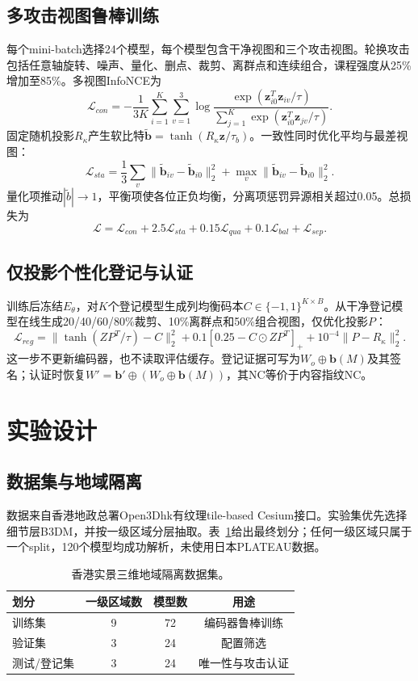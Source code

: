 \documentclass[UTF8,fontset=fandol,11pt]{ctexart}
\begin{document}
\subsection{多攻击视图鲁棒训练}
每个mini-batch选择24个模型，每个模型包含干净视图和三个攻击视图。轮换攻击包括任意轴旋转、噪声、量化、删点、裁剪、离群点和连续组合，课程强度从25\%增加至85\%。多视图InfoNCE为
\begin{equation}\mathcal L_{con}=-\frac1{3K}\sum_{i=1}^K\sum_{v=1}^3\log\frac{\exp(\bm z_{i0}^T\bm z_{iv}/\tau)}{\sum_{j=1}^K\exp(\bm z_{i0}^T\bm z_{jv}/\tau)}.\end{equation}
固定随机投影$R_\kappa$产生软比特$\widetilde{\bm b}=\tanh(R_\kappa\bm z/\tau_b)$。一致性同时优化平均与最差视图：
\begin{equation}\mathcal L_{sta}=\frac13\sum_v\|\widetilde{\bm b}_{iv}-\widetilde{\bm b}_{i0}\|_2^2+\max_v\|\widetilde{\bm b}_{iv}-\widetilde{\bm b}_{i0}\|_2^2.\end{equation}
量化项推动$|\widetilde b|\to1$，平衡项使各位正负均衡，分离项惩罚异源相关超过0.05。总损失为
\begin{equation}\mathcal L=\mathcal L_{con}+2.5\mathcal L_{sta}+0.15\mathcal L_{qua}+0.1\mathcal L_{bal}+\mathcal L_{sep}.\end{equation}

\subsection{仅投影个性化登记与认证}
训练后冻结$E_\theta$，对$K$个登记模型生成列均衡码本$C\in\{-1,1\}^{K\times B}$。从干净登记模型在线生成20/40/60/80\%裁剪、10\%离群点和50\%组合视图，仅优化投影$P$：
\begin{equation}\mathcal L_{reg}=\|\tanh(ZP^T/\tau)-C\|_2^2+0.1[0.25-C\odot ZP^T]_++10^{-4}\|P-R_\kappa\|_2^2.\end{equation}
这一步不更新编码器，也不读取评估缓存。登记证据可写为$W_o\oplus\bm b(M)$及其签名；认证时恢复$W'=\bm b'\oplus(W_o\oplus\bm b(M))$，其NC等价于内容指纹NC。

\section{实验设计}
\subsection{数据集与地域隔离}
数据来自香港地政总署Open3Dhk有纹理tile-based Cesium接口\cite{Open3Dhk}。实验集优先选择细节层B3DM，并按一级区域分层抽取。表~\ref{tab:data}给出最终划分；任何一级区域只属于一个split，120个模型均成功解析，未使用日本PLATEAU数据。
\begin{table}[H]\centering
\caption{香港实景三维地域隔离数据集。}\label{tab:data}
\begin{tabular}{lccc}\toprule 划分&一级区域数&模型数&用途\\\midrule
训练集&9&72&编码器鲁棒训练\\验证集&3&24&配置筛选\\测试/登记集&3&24&唯一性与攻击认证\\\bottomrule\end{tabular}
\end{table}
\end{document}
